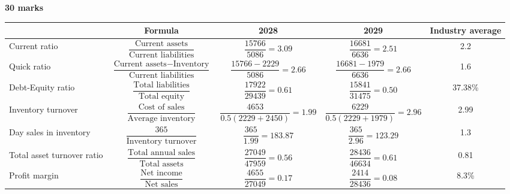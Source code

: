 \textbf{30 marks}
\begin{table}[H]
    \centering
    \begin{adjustbox}{max width=\textwidth}
        \begin{tabular}{@{}lcccc@{}}
            \toprule
                                       & \textbf{Formula}                                                                     & \textbf{2028}                         & \textbf{2029}                         & \textbf{Industry average} \\
            \midrule
            \addlinespace[0.5em]
            Current ratio              & $\dfrac{\textrm{Current assets}}{\textrm{Current liabilities}}$                      & $\dfrac{15766}{5086} = 3.09$          & $\dfrac{16681}{6636} = 2.51$          & 2.2                       \\
            \addlinespace[1em]
            Quick ratio                & $\dfrac{\textrm{Current assets} - \textrm{Inventory}}{\textrm{Current liabilities}}$ & $\dfrac{15766 - 2229}{5086} = 2.66$   & $\dfrac{16681 - 1979}{6636} = 2.66$   & 1.6                       \\
            \addlinespace[1em]
            Debt-Equity ratio          & $\dfrac{\textrm{Total liabilities}}{\textrm{Total equity}}$                          & $\dfrac{17922}{29439} = 0.61$         & $\dfrac{15841}{31475} = 0.50$         & 37.38\%                   \\
            \addlinespace[1em]
            Inventory turnover         & $\dfrac{\textrm{Cost of sales}}{\textrm{Average inventory}}$                         & $\dfrac{4653}{0.5(2229+2450)} = 1.99$ & $\dfrac{6229}{0.5(2229+1979)} = 2.96$ & 2.99                      \\
            \addlinespace[1em]
            Day sales in inventory     & $\dfrac{365}{\textrm{Inventory turnover}}$                                           & $\dfrac{365}{1.99} = 183.87$          & $\dfrac{365}{2.96} = 123.29$          & 1.3                       \\
            \addlinespace[1em]
            Total asset turnover ratio & $\dfrac{\textrm{Total annual sales}}{\textrm{Total assets}}$                         & $\dfrac{27049}{47959} = 0.56$         & $\dfrac{28436}{46634} = 0.61$         & 0.81                      \\
            \addlinespace[1em]
            Profit margin              & $\dfrac{\textrm{Net income}}{\textrm{Net sales}}$                                    & $\dfrac{4655}{27049} = 0.17$          & $\dfrac{2414}{28436} = 0.08$          & 8.3\%                     \\

\end{tabular}
\end{adjustbox}
\end{table}
